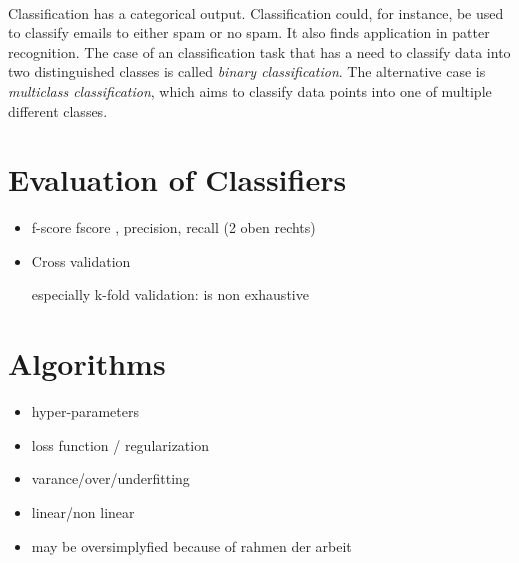 \\
Classification has a categorical output. Classification could, for instance, be used to classify emails to either spam or no spam. It also finds application in patter recognition. %
The case of an classification task that has a need to classify data into two distinguished classes is called \emph{binary classification}. The alternative case is \emph{multiclass classification}, which aims to classify data points into one of multiple different classes.


\section{Evaluation of Classifiers}
\begin{itemize}
\item{f-score}
fscore , precision, recall
(2 oben rechts)
\item{Cross validation}

especially k-fold validation: 
is non exhaustive


\end{itemize}
\section{Algorithms}
\begin{itemize}
\item{hyper-parameters}
\item{loss function / regularization}
\item{varance/over/underfitting}
\item{linear/non linear}
\item{may be oversimplyfied because of rahmen der arbeit}
\end{itemize}
